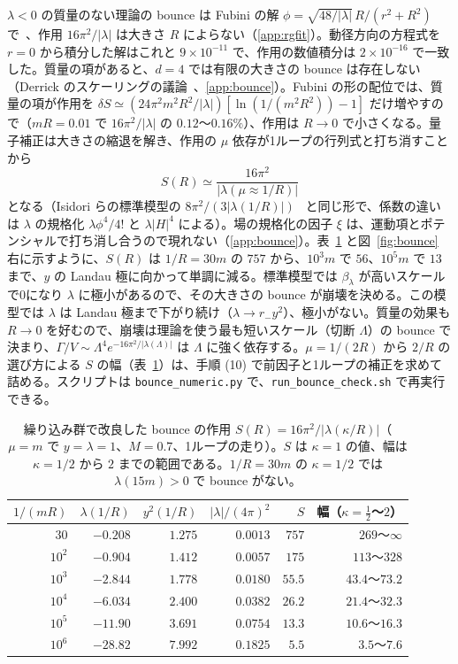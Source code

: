 \documentclass[a4paper,10pt]{ltjsarticle}
\begin{document}
$\lambda<0$ の質量のない理論の bounce は Fubini の解 $\phi=\sqrt{48/|\lambda|}\,R/(r^2+R^2)$ で~\cite{fubini}、作用 $16\pi^2/|\lambda|$ は大きさ $R$ によらない（\ref{app:rgfit}）。動径方向の方程式を $r=0$ から積分した解はこれと $9\times10^{-11}$ で、作用の数値積分は $2\times10^{-16}$ で一致した。質量の項があると、$d=4$ では有限の大きさの bounce は存在しない（Derrick のスケーリングの議論~\cite{derrick}、\ref{app:bounce}）。Fubini の形の配位では、質量の項が作用を $\delta S\simeq(24\pi^2m^2R^2/|\lambda|)[\ln(1/(m^2R^2))-1]$ だけ増やすので（$mR=0.01$ で $16\pi^2/|\lambda|$ の $0.12$〜$0.16\%$）、作用は $R\to0$ で小さくなる。量子補正は大きさの縮退を解き、作用の $\mu$ 依存が1ループの行列式と打ち消すことから
\begin{equation}
S(R)\simeq\frac{16\pi^2}{|\lambda(\mu\approx1/R)|}
\label{eq:bounce}
\end{equation}
となる（Isidori らの標準模型の $8\pi^2/(3|\lambda(1/R)|)$~\cite{isidori} と同じ形で、係数の違いは $\lambda$ の規格化 $\lambda\phi^4/4!$ と $\lambda|H|^4$ による）。場の規格化の因子 $\xi$ は、運動項とポテンシャルで打ち消し合うので現れない（\ref{app:bounce}）。表~\ref{tab:bounce} と図~\ref{fig:bounce} 右に示すように、$S(R)$ は $1/R=30m$ の $757$ から、$10^3m$ で $56$、$10^5m$ で $13$ まで、$y$ の Landau 極に向かって単調に減る。標準模型では $\beta_\lambda$ が高いスケールで0になり $\lambda$ に極小があるので、その大きさの bounce が崩壊を決める。この模型では $\lambda$ は Landau 極まで下がり続け（$\lambda\to r_-y^2$）、極小がない。質量の効果も $R\to0$ を好むので、崩壊は理論を使う最も短いスケール（切断 $\Lambda$）の bounce で決まり、$\Gamma/V\sim\Lambda^4e^{-16\pi^2/|\lambda(\Lambda)|}$ は $\Lambda$ に強く依存する。$\mu=1/(2R)$ から $2/R$ の選び方による $S$ の幅（表~\ref{tab:bounce}）は、手順 (10) で前因子と1ループの補正を求めて詰める。スクリプトは \texttt{bounce\_numeric.py} で、\texttt{run\_bounce\_check.sh} で再実行できる。

\begin{table}[tbp]
\centering\small
\caption{繰り込み群で改良した bounce の作用 $S(R)=16\pi^2/|\lambda(\kappa/R)|$（$\mu=m$ で $y=\lambda=1$、$M=0.7$、1ループの走り）。$S$ は $\kappa=1$ の値、幅は $\kappa=1/2$ から $2$ までの範囲である。$1/R=30m$ の $\kappa=1/2$ では $\lambda(15m)>0$ で bounce がない。}
\label{tab:bounce}
\begin{tabular}{rrrrrr}
\toprule
$1/(mR)$ & $\lambda(1/R)$ & $y^2(1/R)$ & $|\lambda|/(4\pi)^2$ & $S$ & 幅（$\kappa=\frac12$〜$2$） \\
\midrule
$30$ & $-0.208$ & $1.275$ & $0.0013$ & $757$ & $269$〜$\infty$ \\
$10^2$ & $-0.904$ & $1.412$ & $0.0057$ & $175$ & $113$〜$328$ \\
$10^3$ & $-2.844$ & $1.778$ & $0.0180$ & $55.5$ & $43.4$〜$73.2$ \\
$10^4$ & $-6.034$ & $2.400$ & $0.0382$ & $26.2$ & $21.4$〜$32.3$ \\
$10^5$ & $-11.90$ & $3.691$ & $0.0754$ & $13.3$ & $10.6$〜$16.3$ \\
$10^6$ & $-28.82$ & $7.992$ & $0.1825$ & $5.5$ & $3.5$〜$7.6$ \\
\bottomrule
\end{tabular}
\end{table}
\end{document}
